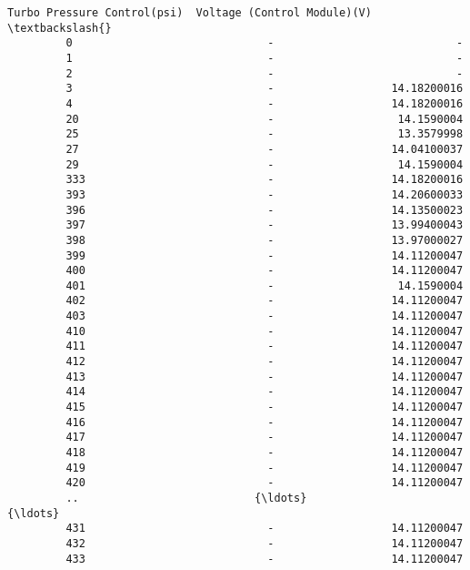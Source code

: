 \documentclass[11pt]{article}
\begin{document}
\begin{Verbatim}[commandchars=\\\{\}]
              Turbo Pressure Control(psi)  Voltage (Control Module)(V)  \textbackslash{}
         0                              -                            -   
         1                              -                            -   
         2                              -                            -   
         3                              -                  14.18200016   
         4                              -                  14.18200016   
         20                             -                   14.1590004   
         25                             -                   13.3579998   
         27                             -                  14.04100037   
         29                             -                   14.1590004   
         333                            -                  14.18200016   
         393                            -                  14.20600033   
         396                            -                  14.13500023   
         397                            -                  13.99400043   
         398                            -                  13.97000027   
         399                            -                  14.11200047   
         400                            -                  14.11200047   
         401                            -                   14.1590004   
         402                            -                  14.11200047   
         403                            -                  14.11200047   
         410                            -                  14.11200047   
         411                            -                  14.11200047   
         412                            -                  14.11200047   
         413                            -                  14.11200047   
         414                            -                  14.11200047   
         415                            -                  14.11200047   
         416                            -                  14.11200047   
         417                            -                  14.11200047   
         418                            -                  14.11200047   
         419                            -                  14.11200047   
         420                            -                  14.11200047   
         ..                           {\ldots}                          {\ldots}   
         431                            -                  14.11200047   
         432                            -                  14.11200047   
         433                            -                  14.11200047   

\end{Verbatim}
\end{document}
